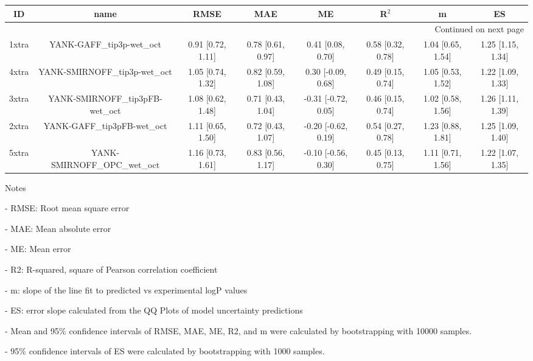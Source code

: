 \documentclass{article}
\begin{document}
\begin{center}
\begin{longtable}{|cccccccc|}
\toprule
    ID &                             name &               RMSE &                MAE &                   ME &              R$^2$ &                  m &                 ES \\
\midrule
\endhead
\midrule
\multicolumn{8}{r}{{Continued on next page}} \\
\midrule
\endfoot

\bottomrule
\endlastfoot
 1xtra &        YANK-GAFF\_tip3p-wet\_oct &  0.91 [0.72, 1.11] &  0.78 [0.61, 0.97] &    0.41 [0.08, 0.70] &  0.58 [0.32, 0.78] &  1.04 [0.65, 1.54] &  1.25 [1.15, 1.34] \\
 4xtra &    YANK-SMIRNOFF\_tip3p-wet\_oct &  1.05 [0.74, 1.32] &  0.82 [0.59, 1.08] &   0.30 [-0.09, 0.68] &  0.49 [0.15, 0.74] &  1.05 [0.53, 1.52] &  1.22 [1.09, 1.33] \\
 3xtra &  YANK-SMIRNOFF\_tip3pFB-wet\_oct &  1.08 [0.62, 1.48] &  0.71 [0.43, 1.04] &  -0.31 [-0.72, 0.05] &  0.46 [0.15, 0.74] &  1.02 [0.58, 1.56] &  1.26 [1.11, 1.39] \\
 2xtra &      YANK-GAFF\_tip3pFB-wet\_oct &  1.11 [0.65, 1.50] &  0.72 [0.43, 1.07] &  -0.20 [-0.62, 0.19] &  0.54 [0.27, 0.78] &  1.23 [0.88, 1.81] &  1.25 [1.09, 1.40] \\
 5xtra &     YANK-SMIRNOFF\_OPC\_wet\_oct &  1.16 [0.73, 1.61] &  0.83 [0.56, 1.17] &  -0.10 [-0.56, 0.30] &  0.45 [0.13, 0.75] &  1.11 [0.71, 1.56] &  1.22 [1.07, 1.35] \\
\end{longtable}
\end{center}

Notes

- RMSE: Root mean square error

- MAE: Mean absolute error

- ME: Mean error

- R2: R-squared, square of Pearson correlation coefficient

- m: slope of the line fit to predicted vs experimental logP values

- ES: error slope calculated from the QQ Plots of model uncertainty predictions

- Mean and 95\% confidence intervals of RMSE, MAE, ME, R2, and m were calculated by bootstrapping with 10000 samples.

- 95\% confidence intervals of ES were calculated by bootstrapping with 1000 samples.\end{document}
\end{document}
